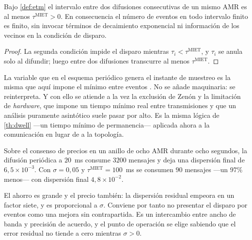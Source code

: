 \begin{proposicion}
\label{pr:miet}
Bajo \cref{def:etm} el intervalo entre dos difusiones consecutivas de un mismo
AMR es al menos $\tau^{\mathrm{MIET}}>0$. En consecuencia el número de eventos en
todo intervalo finito es finito, sin invocar términos de decaimiento
exponencial ni información de los vecinos en la condición de disparo.
\end{proposicion}

\begin{proof}
La segunda condición impide el disparo mientras $\tau_i<\tau^{\mathrm{MIET}}$, y
$\tau_i$ se anula solo al difundir; luego entre dos difusiones transcurre al
menos $\tau^{\mathrm{MIET}}$.
\end{proof}

\begin{observacion}
\label{obs:temporizador-doble}
La variable que en el esquema periódico genera el instante de muestreo es la
misma que aquí impone el mínimo entre eventos \cite{zhao2024hybrid}. No se añade
maquinaria: se reinterpreta. Y con ello se atiende a la vez la exclusión de
Zenón y la limitación de \emph{hardware}, que impone un tiempo mínimo real entre
transmisiones y que un análisis puramente asintótico suele pasar por alto. Es la
misma lógica de \cref{th:dwell} —un tiempo mínimo de permanencia— aplicada ahora
a la comunicación en lugar de a la topología.
\end{observacion}

\begin{observacion}
\label{obs:etm-ahorro}
Sobre el consenso de precios en un anillo de ocho AMR durante ocho segundos, la
difusión periódica a $20$~ms consume $3200$ mensajes y deja una dispersión final
de $6{,}5\times10^{-3}$. Con $\sigma=0{,}05$ y $\tau^{\mathrm{MIET}}=100$~ms se
consumen $90$ mensajes —un $97\%$ menos— con dispersión final
$4{,}8\times10^{-2}$.

El ahorro es grande y el precio también: la dispersión residual empeora en un
factor siete, y es proporcional a $\sigma$. Conviene por tanto no presentar el
disparo por eventos como una mejora sin contrapartida. Es un intercambio entre
ancho de banda y precisión de acuerdo, y el punto de operación se elige sabiendo
que el error residual no tiende a cero mientras $\sigma>0$.
\end{observacion}

